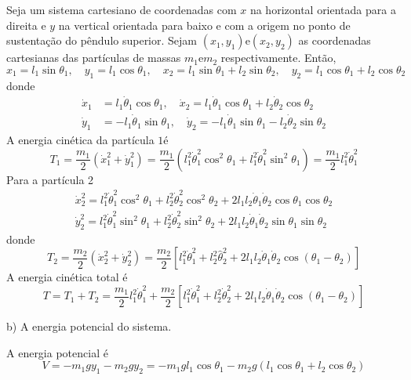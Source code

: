 \begin{enumerate}[start=1,label={\bfseries Q\arabic*.}]
\resposta Seja um sistema cartesiano de coordenadas com $x$ na horizontal orientada para a direita e $y$ na vertical orientada para baixo e com a origem no ponto de sustentação do pêndulo superior. Sejam $\left(x_{1}, y_{1}\right) \mathrm{e}\left(x_{2}, y_{2}\right)$ as coordenadas cartesianas das partículas de massas $m_{1} \mathrm{e} m_{2}$ respectivamente. Então,
$$
x_{1}=l_{1} \sin \theta_{1}, \quad y_{1}=l_{1} \cos \theta_{1}, \quad x_{2}=l_{1} \sin \theta_{1}+l_{2} \sin \theta_{2}, \quad y_{2}=l_{1} \cos \theta_{1}+l_{2} \cos \theta_{2}
$$
donde
$$
\begin{aligned}
\dot{x}_{1} &=l_{1} \dot{\theta}_{1} \cos \theta_{1}, \quad \dot{x}_{2}=l_{1} \dot{\theta}_{1} \cos \theta_{1}+l_{2} \dot{\theta}_{2} \cos \theta_{2} \\
\dot{y}_{1} &=-l_{1} \dot{\theta}_{1} \sin \theta_{1}, \quad \dot{y}_{2}=-l_{1} \dot{\theta}_{1} \sin \theta_{1}-l_{2} \dot{\theta}_{2} \sin \theta_{2}
\end{aligned}
$$
A energia cinética da partícula $1 é$
$$
T_{1}=\frac{m_{1}}{2}\left(\dot{x}_{1}^{2}+\dot{y}_{1}^{2}\right)=\frac{m_{1}}{2}\left(l_{1}^{2} \dot{\theta}_{1}^{2} \cos ^{2} \theta_{1}+l_{1}^{2} \dot{\theta}_{1}^{2} \sin ^{2} \theta_{1}\right)=\frac{m_{1}}{2} l_{1}^{2} \dot{\theta}_{1}^{2}
$$
Para a partícula 2
$$
\begin{array}{l}
\dot{x}_{2}^{2}=l_{1}^{2} \dot{\theta}_{1}^{2} \cos ^{2} \theta_{1}+l_{2}^{2} \dot{\theta}_{2}^{2} \cos ^{2} \theta_{2}+2 l_{1} l_{2} \dot{\theta}_{1} \dot{\theta}_{2} \cos \theta_{1} \cos \theta_{2} \\
\dot{y}_{2}^{2}=l_{1}^{2} \dot{\theta}_{1}^{2} \sin ^{2} \theta_{1}+l_{2}^{2} \dot{\theta}_{2}^{2} \sin ^{2} \theta_{2}+2 l_{1} l_{2} \dot{\theta}_{1} \dot{\theta}_{2} \sin \theta_{1} \sin \theta_{2}
\end{array}
$$
donde
$$
T_{2}=\frac{m_{2}}{2}\left(\dot{x}_{2}^{2}+\dot{y}_{2}^{2}\right)=\frac{m_{2}}{2}\left[l_{1}^{2} \dot{\theta}_{1}^{2}+l_{2}^{2} \hat{\theta}_{2}^{2}+2 l_{1} l_{2} \dot{\theta}_{1} \dot{\theta}_{2} \cos \left(\theta_{1}-\theta_{2}\right)\right]
$$
A energia cinética total é
$$
T=T_{1}+T_{2}=\frac{m_{1}}{2} l_{1}^{2} \dot{\theta}_{1}^{2}+\frac{m_{2}}{2}\left[l_{1}^{2} \dot{\theta}_{1}^{2}+l_{2}^{2} \dot{\theta}_{2}^{2}+2 l_{1} l_{2} \dot{\theta}_{1} \dot{\theta}_{2} \cos \left(\theta_{1}-\theta_{2}\right)\right]
$$

b) A energia potencial do sistema.

\resposta A energia potencial é
$$
V=-m_{1} g y_{1}-m_{2} g y_{2}=-m_{1} g l_{1} \cos \theta_{1}-m_{2} g\left(l_{1} \cos \theta_{1}+l_{2} \cos \theta_{2}\right)
$$



\end{enumerate}
